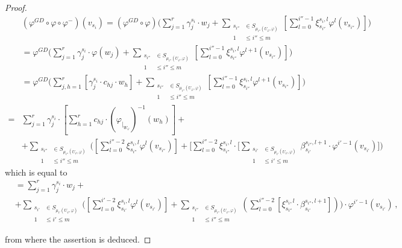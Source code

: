 \documentclass[10pt,a4paper]{amsart}
\theoremstyle{plain}
\theoremstyle{remark}
\numberwithin{equation}{section} \numberwithin{defn}{section}
\newcommand{\f}{\varphi}
\begin{document}
\begin{proof}
$$\begin{aligned} &(\f^{GD}\circ \f \circ \f^-)(v_{s_i}) =  (\f^{GD}\circ \f) \big (\sum_{j=1}^r \gamma_j^{s_i}\cdot w_j + \underset {\begin{aligned} s_{i''} &\in S_{{\mu}_{i''} (U_\varphi, \varphi)} \\ 1 &\leq i'' \leq m \end{aligned}} \sum [\sum_{l=0}^{i''-1} \xi_{s_{i''}}^{s_i,l} \varphi^{l} ({{v_{s_{i''}}}})] \big )  \\ &=  \f^{GD} \big (\sum_{j=1}^r \gamma_j^{s_i}\cdot \varphi (w_j)+ \underset {\begin{aligned} s_{i''} &\in S_{{\mu}_{i''} (U_\varphi, \varphi)} \\ 1 &\leq i'' \leq m \end{aligned}} \sum [\sum_{l=0}^{i''-1} \xi_{s_{i''}}^{s_i,l} \varphi^{l+1} ({{v_{s_{i''}}}})]  \big )  \\ &=  \f^{GD} \big (\sum_{j,h=1}^r [\gamma_j^{s_i} \cdot c_{hj}\cdot w_h]+ \underset {\begin{aligned} s_{i''} &\in S_{{\mu}_{i''} (U_\varphi, \varphi)} \\ 1 &\leq i'' \leq m \end{aligned}} \sum [\sum_{l=0}^{i''-1} \xi_{s_{i''}}^{s_i,l} \varphi^{l+1} ({{v_{s_{i''}}}})]  \big )\\=&\sum_{j=1}^r \gamma_j^{s_i}\cdot [\sum_{h=1}^r c_{hj}\cdot (\varphi_{\vert_{W_\varphi}})^{-1} (w_h) ]+ \\ &+ \underset {\begin{aligned} s_{i''} &\in S_{{\mu}_{i''} (U_\varphi, \varphi)} \\ 1 &\leq i'' \leq m \end{aligned}} \sum \big ( [\sum_{l=0}^{i''-2} \xi_{s_{i''}}^{s_i,l} \varphi^{l} ({{v_{s_{i''}}}})] + [\sum_{l=0}^{i''-2} \xi_{s_{i''}}^{s_i,l} \cdot \big [\underset {\begin{aligned} s_{i'} &\in S_{{\mu}_{i'} (U_\varphi, \varphi)} \\ 1 &\leq i' \leq m \end{aligned}} \sum \beta_{s_{i'}}^{s_{i''},l+1}\cdot \varphi^{i'-1} ({ {v_{s_{i'}}}})\big ]  \big ) \end{aligned}$$ which is equal to $$\begin{aligned} &= \sum_{j=1}^r \gamma_j^{s_i}\cdot w_j +\\ &+ \underset {\begin{aligned} s_{i'} &\in S_{{\mu}_{i' } (U_\varphi, \varphi)} \\ 1 &\leq i' \leq m \end{aligned}} \sum \big ( [\sum_{l=0}^{i'-2} \xi_{s_{i'}}^{s_i,l} \varphi^{l} ({{v_{s_{i'}}}})] +  \underset {\begin{aligned} s_{i''} &\in S_{{\mu}_{i''} (U_\varphi, \varphi)} \\ 1 &\leq i'' \leq m \end{aligned}} \sum {( \sum_{l=0}^{i''-2} [\xi_{s_{i''}}^{s_i,l} \cdot \beta_{s_{i'}}^{s_{i''},l+1}] )}\big )\cdot \varphi^{i'-1} ({ {v_{s_{i'}}}})\, ,\end{aligned}$$

\noindent from where the assertion is deduced.\end{proof}
\end{document}
